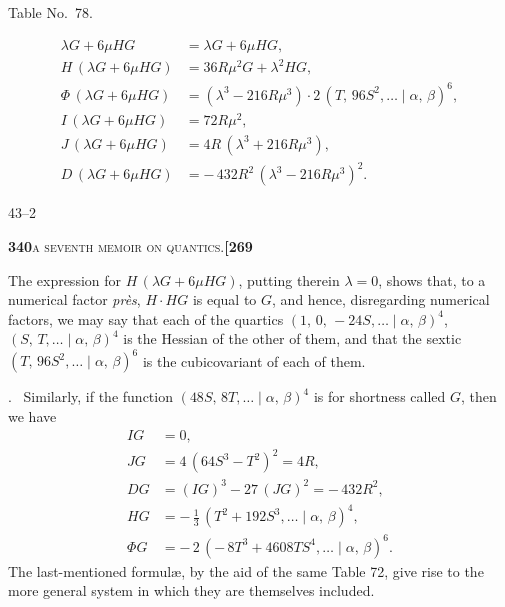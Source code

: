 \documentclass[11pt]{article}
\newcommand{\Cdel}{\mid}
\begin{document}
\begin{center}Table No.~78.\end{center}
\[
\begin{aligned}
   \lambda G + 6\mu H G &= \lambda G + 6\mu H G,\\
   H\,(\lambda G + 6\mu H G) &= 36 R\mu^2 G + \lambda^2 H G,\\
   \Phi\,(\lambda G + 6\mu H G) &= (\lambda^3 - 216 R\mu^3)\cdot 2\,(T,\,96 S^2,\ldots\Cdel\alpha,\,\beta)^6,\\
   I\,(\lambda G + 6\mu H G) &= 72 R\mu^2,\\
   J\,(\lambda G + 6\mu H G) &= 4 R\,(\lambda^3 + 216 R\mu^3),\\
   D\,(\lambda G + 6\mu H G) &= -\,432 R^2\,(\lambda^3 - 216 R\mu^3)^2.
\end{aligned}
\]

\hfill 43--2

\newpage
\setcounter{page}{340}

\noindent\textbf{340}\hfill\textsc{a seventh memoir on quantics.}\hfill\textbf{[269}

\medskip

\noindent The expression for $H\,(\lambda G + 6\mu H G)$, putting therein $\lambda = 0$, shows that, to a numerical factor \textit{pr\`es}, $H\cdot H G$ is equal to $G$, and hence, disregarding numerical factors, we may say that each of the quartics $(1,\,0,\,-24 S,\ldots\Cdel\alpha,\,\beta)^4$, $(S,\,T,\ldots\Cdel\alpha,\,\beta)^4$ is the Hessian of the other of them, and that the sextic $(T,\,96 S^2,\ldots\Cdel\alpha,\,\beta)^6$ is the cubicovariant of each of them.

\medskip

. \ Similarly, if the function $(48 S,\,8 T,\ldots\Cdel\alpha,\,\beta)^4$ is for shortness called $G$, then we have
\[
\begin{aligned}
   I G &= 0,\\
   J G &= 4\,(64 S^3 - T^2)^2 = 4 R,\\
   D G &= (I G)^3 - 27\,(J G)^2 = -\,432 R^2,\\
   H G &= -\,\tfrac{1}{3}\,(T^2 + 192 S^3,\ldots\Cdel\alpha,\,\beta)^4,\\
   \Phi G &= -\,2\,(-\,8 T^3 + 4608 T S^4,\ldots\Cdel\alpha,\,\beta)^6.
\end{aligned}
\]
The last-mentioned formul\ae, by the aid of the same Table 72, give rise to the more general system in which they are themselves included.
\end{document}
